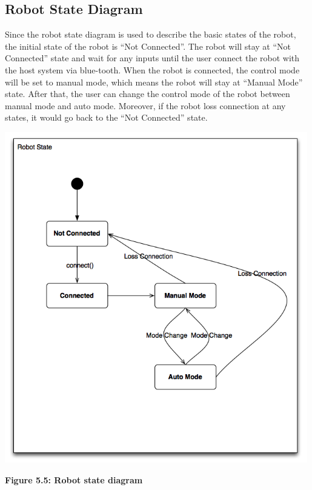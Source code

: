 \documentclass[11pt, a4paper]{report}
\begin{document}
\subsection{Robot State Diagram}
Since the robot state diagram is used to describe the basic states of the robot, the initial state of the robot is ``Not Connected''.  The robot will stay at ``Not Connected'' state and wait for any inputs until the user connect the robot with the host system via blue-tooth. When the robot is connected, the control mode will be set to manual mode, which means the robot will stay at ``Manual Mode'' state. After that, the user can change the control mode of the robot between manual mode and auto mode. Moreover, if the robot loss connection at any states, it would go back to the ``Not Connected'' state.
 \begin{center}
 \includegraphics[width=13.20cm]{RobotState.png}
\end{center}
\begin{center}
\textbf {Figure 5.5: Robot state diagram} \\[0.3cm]
\end{center}
\pagebreak
\end{document}
